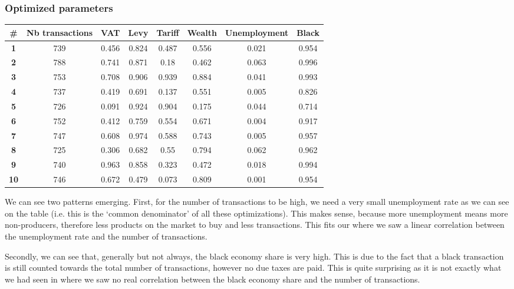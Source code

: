         \subsubsection{Optimized parameters}
        \begin{table}[H]
        \centering
        \begin{tabular}{|c|c|c|c|c|c|c|c|}
            \hline
            \textbf{\#} & \textbf{Nb transactions}  & \textbf{VAT} & \textbf{Levy} & \textbf{Tariff} & \textbf{Wealth} & \textbf{Unemployment} & \textbf{Black} \\ \hline
            \textbf{1} & 739 & 0.456 & 0.824 & 0.487 & 0.556 & 0.021 & 0.954 \\ \hline
            \textbf{2} & 788 & 0.741 & 0.871 & 0.18 & 0.462 & 0.063 & 0.996 \\ \hline
            \textbf{3} & 753 & 0.708 & 0.906 & 0.939 & 0.884 & 0.041 & 0.993 \\ \hline
            \textbf{4} & 737 & 0.419 & 0.691 & 0.137 & 0.551 & 0.005 & 0.826 \\ \hline
            \textbf{5} & 726 & 0.091 & 0.924 & 0.904 & 0.175 & 0.044 & 0.714 \\ \hline
            \textbf{6} & 752 & 0.412 & 0.759 & 0.554 & 0.671 & 0.004 & 0.917 \\ \hline
            \textbf{7} & 747 & 0.608 & 0.974 & 0.588 & 0.743 & 0.005 & 0.957 \\ \hline
            \textbf{8} & 725 & 0.306 & 0.682 & 0.55 & 0.794 & 0.062 & 0.962 \\ \hline
            \textbf{9} & 740 & 0.963 & 0.858 & 0.323 & 0.472 & 0.018 & 0.994 \\ \hline
            \textbf{10} & 746 & 0.672 & 0.479 & 0.073 & 0.809 & 0.001 & 0.954 \\ \hline
        \end{tabular}
        \end{table}

        We can see two patterns emerging. First, for the number of transactions to be high, we need a very small unemployment rate as we can see on the table (i.e. this is the `common denominator' of all these optimizations). This makes sense, because more unemployment means more non-producers, therefore less products on the market to buy and less transactions. This fits our  where we saw a linear correlation between the unemployment rate and the number of transactions.

        Secondly, we can see that, generally but not always, the black economy share is very high. This is due to the fact that a black transaction is still counted towards the total number of transactions, however no due taxes are paid. This is quite surprising as it is not exactly what we had seen in  where we saw no real correlation between the black economy share and the number of transactions.

